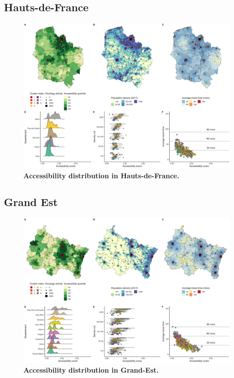 \subsection*{Hauts-de-France}

\begin{figure}[H]
    \includegraphics[width=\textwidth]{images/camion/region_accessibility/accessibility_Hauts-de-France.png}
    \centering
    \caption{
        \textbf{Accessibility distribution in Hauts-de-France.}
    }
\end{figure}

\subsection*{Grand Est}

\begin{figure}[H]
    \includegraphics[width=\textwidth]{images/camion/region_accessibility/accessibility_Grand-Est.png}
    \centering
    \caption{
        \textbf{Accessibility distribution in Grand-Est.}
    }
\end{figure}

